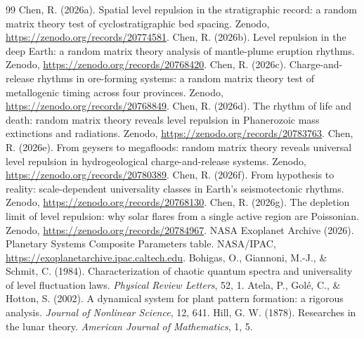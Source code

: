 \documentclass[12pt,a4paper]{article}
\begin{document}
\begin{thebibliography}{99}
\small
{} Chen, R. (2026a). Spatial level repulsion in the stratigraphic record: a random matrix theory test of cyclostratigraphic bed spacing. Zenodo, \url{https://zenodo.org/records/20774581}.
 Chen, R. (2026b). Level repulsion in the deep Earth: a random matrix theory analysis of mantle-plume eruption rhythms. Zenodo, \url{https://zenodo.org/records/20768420}.
 Chen, R. (2026c). Charge-and-release rhythms in ore-forming systems: a random matrix theory test of metallogenic timing across four provinces. Zenodo, \url{https://zenodo.org/records/20768849}.
 Chen, R. (2026d). The rhythm of life and death: random matrix theory reveals level repulsion in Phanerozoic mass extinctions and radiations. Zenodo, \url{https://zenodo.org/records/20783763}.
 Chen, R. (2026e). From geysers to megafloods: random matrix theory reveals universal level repulsion in hydrogeological charge-and-release systems. Zenodo, \url{https://zenodo.org/records/20780389}.
 Chen, R. (2026f). From hypothesis to reality: scale-dependent universality classes in Earth's seismotectonic rhythms. Zenodo, \url{https://zenodo.org/records/20768130}.
 Chen, R. (2026g). The depletion limit of level repulsion: why solar flares from a single active region are Poissonian. Zenodo, \url{https://zenodo.org/records/20784967}.
 NASA Exoplanet Archive (2026). Planetary Systems Composite Parameters table. NASA/IPAC, \url{https://exoplanetarchive.ipac.caltech.edu}.
 Bohigas, O., Giannoni, M.-J., \& Schmit, C. (1984). Characterization of chaotic quantum spectra and universality of level fluctuation laws. \emph{Physical Review Letters}, 52, 1.
 Atela, P., Gol\'e, C., \& Hotton, S. (2002). A dynamical system for plant pattern formation: a rigorous analysis. \emph{Journal of Nonlinear Science}, 12, 641.
 Hill, G. W. (1878). Researches in the lunar theory. \emph{American Journal of Mathematics}, 1, 5.
\end{thebibliography}
\end{document}

